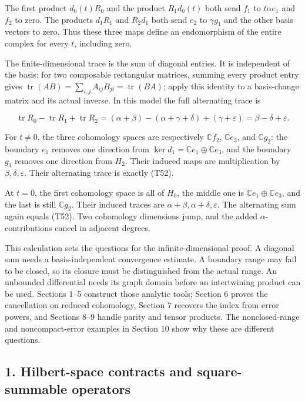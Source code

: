 \documentclass[
  11pt,
]{article}
\begin{document}
The first product \(d_0(t)R_0\) and the product \(R_1d_0(t)\) both send
\(f_1\) to \(t\alpha e_1\) and \(f_2\) to zero. The products \(d_1R_1\)
and \(R_2d_1\) both send \(e_2\) to \(\gamma g_1\) and the other basis
vectors to zero. Thus these three maps define an endomorphism of the
entire complex for every \(t\), including zero.

The finite-dimensional trace is the sum of diagonal entries. It is
independent of the basis: for two composable rectangular matrices,
summing every product entry gives
\(\operatorname{tr}(AB)=\sum_{i,j}A_{ij}B_{ji}=\operatorname{tr}(BA)\);
apply this identity to a basis-change matrix and its actual inverse. In
this model the full alternating trace is

\[
 \operatorname{tr}R_0-\operatorname{tr}R_1+\operatorname{tr}R_2
 =(\alpha+\beta)-(\alpha+\gamma+\delta)+(\gamma+\varepsilon)
 =\beta-\delta+\varepsilon.                                     \tag{T52}
\]

For \(t\ne0\), the three cohomology spaces are respectively
\(\mathbb Cf_2\), \(\mathbb Ce_3\), and \(\mathbb Cg_2\): the boundary
\(e_1\) removes one direction from
\(\ker d_1=\mathbb Ce_1\oplus\mathbb Ce_3\), and the boundary \(g_1\)
removes one direction from \(H_2\). Their induced maps are
multiplication by \(\beta,\delta,\varepsilon\). Their alternating trace
is exactly (T52).

At \(t=0\), the first cohomology space is all of \(H_0\), the middle one
is \(\mathbb Ce_1\oplus\mathbb Ce_3\), and the last is still
\(\mathbb Cg_2\). Their induced traces are
\(\alpha+\beta,\alpha+\delta,\varepsilon\). The alternating sum again
equals (T52). Two cohomology dimensions jump, and the added
\(\alpha\)-contributions cancel in adjacent degrees.

This calculation sets the questions for the infinite-dimensional proof.
A diagonal sum needs a basis-independent convergence estimate. A
boundary range may fail to be closed, so its closure must be
distinguished from the actual range. An unbounded differential needs its
graph domain before an intertwining product can be used. Sections 1--5
construct those analytic tools; Section 6 proves the cancellation on
reduced cohomology, Section 7 recovers the index from error powers, and
Sections 8--9 handle parity and tensor products. The nonclosed-range and
noncompact-error examples in Section 10 show why these are different
questions.

\subsection{1. Hilbert-space contracts and square-summable
operators}\label{hilbert-space-contracts-and-square-summable-operators}
\end{document}
